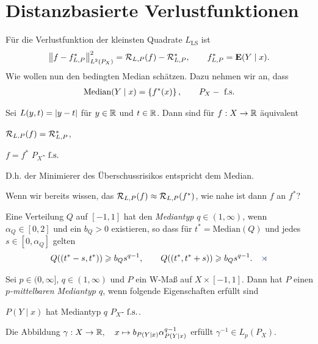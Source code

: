 \section{Distanzbasierte Verlustfunktionen}

\newcommand{\Med}{\mathrm{Median}}
Für die Verlustfunktion der kleinsten Quadrate $L_\mathrm{LS}$ ist
\begin{align*}
\left\|f-f_{L,P}^*\right\|_{L^2(P_X)}^2
= \mathcal{R}_{L,P}(f) - \mathcal{R}_{L,P}^*,\qquad f_{L,P}^* = \textbf{E}(Y\mid x).
\end{align*}
Wie wollen nun den bedingten Median schätzen. Dazu nehmen wir an, dass
\begin{align*}
\Med(Y\mid x) = \setd{f^*(x)},\qquad P_X-\fs
\end{align*}

\begin{prop}
\label{prop:7.2.1}
Sei $L(y,t) = \left|y-t\right|$ für $y\in\mathbb{R}$ und $t\in \mathbb{R}$. Dann sind für $f: X\to \mathbb{R}$
äquivalent
\begin{equivenum}
\item $\mathcal{R}_{L,P}(f) = \mathcal{R}_{L,P}^*$,
\item $f= f^*$ $P_X$-$\ \text{f.s.}$
\end{equivenum}
D.h. der Minimierer des Überschussrisikos entspricht dem Median.\fishhere
\end{prop}

Wenn wir bereits wissen, das $\mathcal{R}_{L,P}(f)\approx \mathcal{R}_{L,P}(f^*)$, wie nahe ist
dann $f$ an $f^*$?

\begin{defn*}
Eine Verteilung $Q$ auf $[-1,1]$ hat den \emph{Mediantyp} $q\in (1,\infty)$,
wenn $\alpha_Q\in [0,2]$ und ein $b_Q> 0$ existieren, so dass für $t^*=\Med(Q)$
und jedes $s\in [0,\alpha_Q]$ gelten
\begin{align*}
Q((t^*-s,t^*)) \ge b_Q s^{q-1},\qquad
Q((t^*,t^*+s)) \ge b_Q s^{q-1}.\fishhere
\end{align*}
\end{defn*}

\begin{defn*}
Sei $p\in (0,\infty]$, $q\in (1,\infty)$ und $P$ ein W-Maß auf $X\times [-1,1]$.
Dann hat $P$ einen \emph{$p$-mittelbaren Mediantyp $q$}, wenn folgende
Eigenschaften erfüllt sind
\begin{defnenum}
\item $P(Y\mid x)$ hat Mediantyp $q$ $P_X$-$\ \text{f.s.}$.
\item Die Abbildung $\gamma: X\to \mathbb{R},\quad x\mapsto b_{P(Y\mid
x)}\alpha_{P(Y\mid x)}^{q-1}$ erfüllt $\gamma^{-1}\in L_p(P_X)$.\fishhere
\end{defnenum}
\end{defn*}

